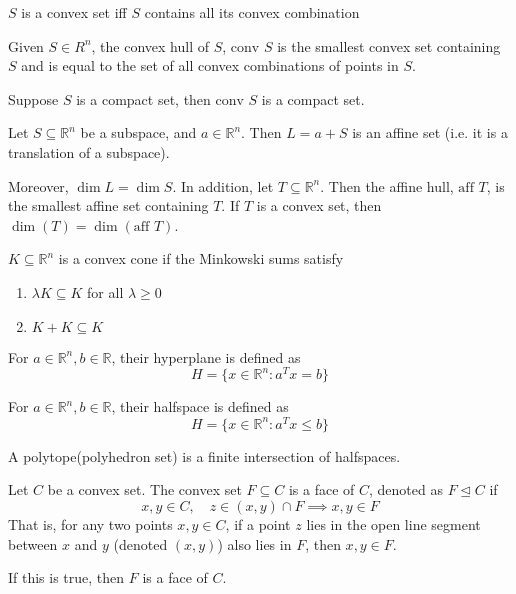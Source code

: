 \begin{lemma}
    $S$ is a convex set iff $S$ contains all its convex combination
\end{lemma}
\begin{definition}
    Given $S\in R^n$, the convex hull of $S$, $\text{conv }S$ is the smallest convex set containing $S$ and is equal to the set of all convex combinations of points in $S$.
\end{definition}

\begin{lemma}
    Suppose $S$ is a compact set, then $\text{conv }S$ is a compact set.
\end{lemma}
\begin{definition}
    Let $S \subseteq \mathbb R^n$ be a subspace, and $a \in \mathbb R^n$. Then $L = a + S$ is an affine set (i.e. it is a translation of a subspace).

    Moreover, $\dim L = \dim S$. In addition, let $T \subseteq \mathbb R^n$. Then the affine hull, $\text{aff }T$, is the smallest affine set containing $T$. If $T$ is a convex set, then $\dim(T) = \dim(\text{aff }T)$.
\end{definition}
\begin{definition}
    $K \subseteq \mathbb R^n$ is a convex cone if the Minkowski sums satisfy
    \begin{enumerate}
        \item $\lambda K \subseteq K$ for all $\lambda \geq 0$
        \item $K + K \subseteq K$
    \end{enumerate}
\end{definition}
\begin{definition}[Hyperplane]
    For $a \in \mathbb R^n, b \in \mathbb R$, their hyperplane is defined as
    $$H = \{x \in \mathbb R^n: a^Tx = b\}$$
\end{definition}
\begin{definition}[Halfspace]
    For $a \in \mathbb R^n, b \in \mathbb R$, their halfspace is defined as
    $$H = \{x \in \mathbb R^n: a^Tx \leq b\}$$
\end{definition}
\begin{definition}[Polytope]
    A polytope(polyhedron set) is a finite intersection of halfspaces.
\end{definition}
\begin{definition}[Face]
    Let $C$ be a convex set. The convex set $F \subseteq C$ is a face of $C$, denoted as $F \unlhd C$ if $$x, y \in C, \quad z \in (x, y) \cap F \implies x, y \in F$$
    That is, for any two points $x,y \in C$, if a point $z$ lies in the open line segment between $x$ and $y$ (denoted $(x,y)$) also lies in $F$, then $x, y \in F$.

    If this is true, then $F$ is a face of $C$.
\end{definition}
